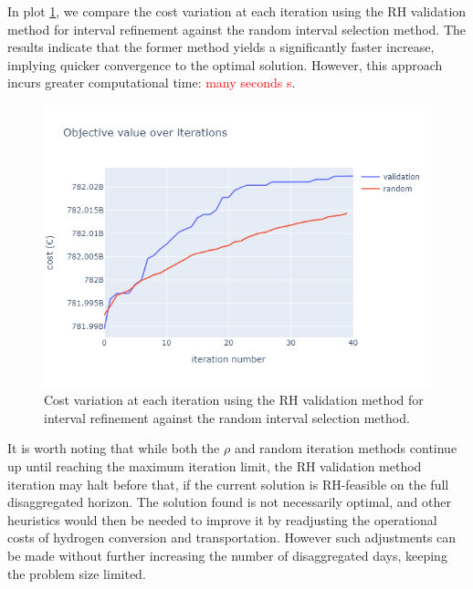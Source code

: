 \documentclass[smallextended,natbib]{svjour3}       %
\numberwithin{definition}{section}
\numberwithin{theorem}{section}
\numberwithin{proposition}{section}
\begin{document}
In plot \ref{fig:val_vs_average}, we compare the cost variation at each iteration using the RH validation method for interval refinement against the random interval selection method. 
The results indicate that the former method yields a significantly faster increase, implying quicker convergence to the optimal solution. 
However, this approach incurs greater computational time: \textcolor{red}{many seconds s}. 
\begin{figure}[htbp]
  \centering
  \includegraphics[width=\textwidth]{images/val_vs_average.png}
  \caption{Cost variation at each iteration using the RH validation method for interval refinement against the random interval selection method.}
  \label{fig:val_vs_average}
\end{figure}

It is worth noting that while both the \(\rho\) and random iteration methods continue up until reaching the maximum iteration limit, the RH validation method iteration may halt before that, if the current solution is RH-feasible on the full disaggregated horizon.
The solution found is not necessarily optimal, and other heuristics would then be needed to improve it by readjusting the operational costs of hydrogen conversion and transportation. 
However such adjustments can be made without further increasing the number of disaggregated days, keeping the problem size limited.
\end{document}
